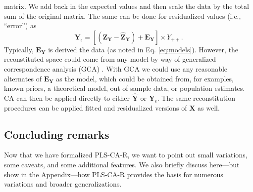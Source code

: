 \documentclass[12pt]{article}
\begin{document}
matrix. We add back in the expected values and then scale the data by
the total sum of the original matrix. The same can be done for
residualized values (i.e., ``error'') as \begin{equation}
{\mathbf Y}_{\epsilon} = [({\mathbf Z}_{\mathbf Y} - \widehat{{\mathbf Z}}_{\mathbf Y}) + {\mathbf E}_{\mathbf Y}] \times Y_{++}.
\label{eq:Yresid}
\end{equation} Typically, \({\mathbf E}_{\mathbf Y}\) is derived the
data (as noted in Eq. \ref{eq:models}). However, the reconstituted space
could come from any model by way of generalized correspondence analysis
(GCA)
\citep{escofier1983analyse, escofier1984analyse, grassi1994correspondence, beaton2018generalization}.
With GCA we could use any reasonable alternates of
\({\mathbf E}_{\mathbf Y}\) as the model, which could be obtained from,
for examples, known priors, a theoretical model, out of sample data, or
population estimates. CA can then be applied directly to either
\(\widehat{\mathbf Y}\) or \({\mathbf Y}_{\epsilon}\). The same
reconstitution procedures can be applied fitted and residualized
versions of \({\mathbf X}\) as well.

\hypertarget{concluding-remarks}{%
\subsection{Concluding remarks}\label{concluding-remarks}}

Now that we have formalized PLS-CA-R, we want to point out small
variations, some caveats, and some additional features. We also briefly
discuss here---but show in the Appendix---how PLS-CA-R provides the
basis for numerous variations and broader generalizations.
\end{document}
